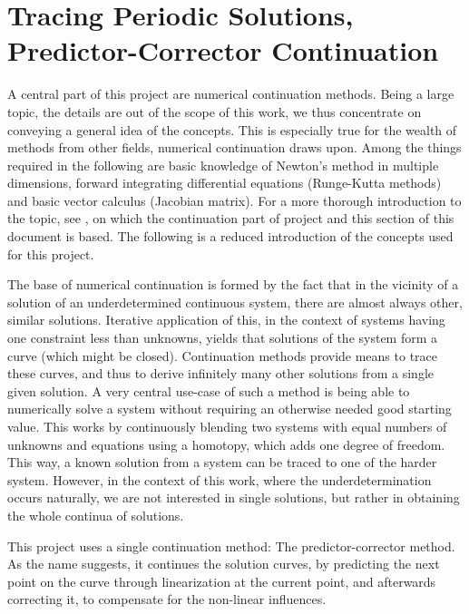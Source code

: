 \section{Tracing Periodic Solutions, Predictor-Corrector Continuation}
\label{sec:cont}


A central part of this project are numerical continuation methods.
Being a large topic, the details are out of the scope of this work, we thus concentrate on conveying a general idea of the concepts.
This is especially true for the wealth of methods from other fields, numerical continuation draws upon.
Among the things required in the following are basic knowledge of Newton's method in multiple dimensions, forward integrating differential equations (Runge-Kutta methods) and basic vector calculus (Jacobian matrix).
For a more thorough introduction to the topic, see \cite{allgower1990numerical}, on which the continuation part of project and this section of this document is based.
The following is a reduced introduction of the concepts used for this project. %

The base of numerical continuation is formed by the fact that in the vicinity of a solution of an underdetermined continuous system, there are almost always other, similar solutions. %
Iterative application of this, in the context of systems having one constraint less than unknowns, yields that solutions of the system form a curve (which might be closed).
Continuation methods provide means to trace these curves, and thus to derive infinitely many other solutions from a single given solution.
A very central use-case of such a method is being able to numerically solve a system without requiring an otherwise needed good starting value.
This works by continuously blending two systems with equal numbers of unknowns and equations using a homotopy, which adds one degree of freedom.
This way, a known solution from a system can be traced to one of the harder system.
However, in the context of this work, where the underdetermination occurs naturally, we are not interested in single solutions, but rather in obtaining the whole continua of solutions.

This project uses a single continuation method: The predictor-corrector method.
As the name suggests, it continues the solution curves, by predicting the next point on the curve through linearization at the current point, and afterwards correcting it, to compensate for the non-linear influences.

